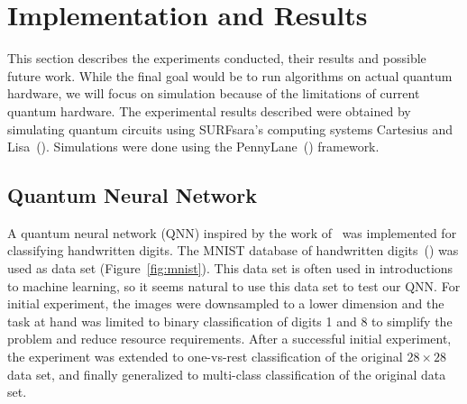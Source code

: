 \documentclass[a4paper,10pt]{article}
\begin{document}
\section{Implementation and Results} \label{sec:implementation-and-results}
This section describes the experiments conducted, their results and possible future work.
While the final goal would be to run algorithms on actual quantum hardware, we will focus on simulation because of the limitations of current quantum hardware.
The experimental results described were obtained by simulating quantum circuits using SURFsara's computing systems Cartesius and Lisa~(\cite{surfsara}).
Simulations were done using the PennyLane~(\cite{bergholm2018pennylane}) framework.

\subsection{Quantum Neural Network}
A quantum neural network (QNN) inspired by the work of~\cite{qnn-near-term} was implemented for classifying handwritten digits.
The MNIST database of handwritten digits~(\cite{mnist-digits}) was used as data set (Figure~\ref{fig:mnist}).
This data set is often used in introductions to machine learning, so it seems natural to use this data set to test our QNN.
For initial experiment, the images were downsampled to a lower dimension and the task at hand was limited to binary classification of digits 1 and 8 to simplify the problem and reduce resource requirements.
After a successful initial experiment, the experiment was extended to one-vs-rest classification of the original $28 \times 28$ data set, and finally generalized to multi-class classification of the original data set.
\end{document}
